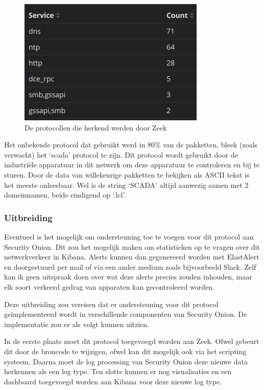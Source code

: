 \documentclass[a4paper,12pt]{report}
\begin{document}
\begin{figure}[H]
  \centering
  \includegraphics[width=\textwidth]{analyse-ot-stats-services}
  \caption{De protocollen die herkend werden door Zeek}
  \label{fig:analyse-ot-stats-services}
\end{figure}

Het onbekende protocol dat gebruikt werd in $80\%$ van de pakketten, bleek (zoals verwacht) het `scada' protocol te zijn.
Dit protocol wordt gebruikt door de industriële apparatuur in dit netwerk om deze apparatuur te controleren en bij te sturen.
Door de data van willekeurige pakketten te bekijken als ASCII tekst is het meeste onleesbaar.
Wel is de string `SCADA' altijd aanwezig samen met 2 domeinnamen, beide eindigend op `.lcl'.

\subsubsection{Uitbreiding}
Eventueel is het mogelijk om ondersteuning toe te voegen voor dit protocol aan Security Onion.
Dit zou het mogelijk maken om statistieken op te vragen over dit netwerkverkeer in Kibana.
Alerts kunnen dan gegenereerd worden met ElastAlert en doorgestuurd per mail of via een ander medium zoals bijvoorbeeld Slack.
Zelf kan ik geen uitspraak doen over wat deze alerts precies zouden inhouden, maar elk soort verkeerd gedrag van apparaten kan gecontroleerd worden.

Deze uitbreiding zou vereisen dat er ondersteuning voor dit protocol geïmplementeerd wordt in verschillende componenten van Security Onion.
De implementatie zou er als volgt kunnen uitzien.

In de eerste plaats moet dit protocol toegevoegd worden aan Zeek.
Ofwel gebeurt dit door de broncode te wijzigen, ofwel kan dit mogelijk ook via het scripting systeem.
Daarna moet de log processing van Security Onion deze nieuwe data herkennen als een log type.
Ten slotte kunnen er nog visualisaties en een dashboard toegevoegd worden aan Kibana voor deze nieuwe log type.
\end{document}
